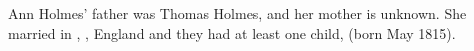 
Ann Holmes' father was Thomas Holmes, and her mother is unknown.
She married  in , , England
and they had at least one child,  (born May 1815).
